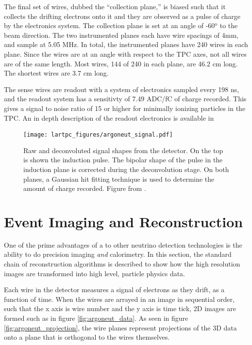 The final set of wires, dubbed the ``collection plane,'' is biased such that it collects the drifting electrons onto it and they are observed as a pulse of charge by the electronics system.  The collection plane is set at an angle of -60$^\text{o}$ to the beam direction.  The two instrumented planes each have wire spacings of 4mm, and sample at 5.05 MHz.  In total, the instrumented planes have 240 wires in each plane.  Since the wires are at an angle with respect to the TPC axes, not all wires are of the same length.  Most wires, 144 of 240 in each plane, are 46.2 cm long.  The shortest wires are 3.7 cm long.

The sense wires are readout with a system of electronics sampled every 198 ns, and the readout system has a sensitivty of 7.49 ADC/fC of charge recorded.  This gives a signal to noise ratio of 15 or higher for minimally ionizing particles in the TPC.  An in depth description of the \argoneut readout electronics is available in \cite{Anderson:2012vc}


\begin{figure}[htbp]
  \centering
  \texttt{[image: lartpc\_figures/argoneut\_signal.pdf]}
  \caption[Deconvolution of \argoneut Signals]{Raw and deconvoluted signal shapes from the \argoneut detector.  On the top is shown the induction pulse.  The bipolar shape of the pulse in the induction plane is corrected during the deconvolution stage.  On both planes, a Gaussian hit fitting technique is used to determine the amount of charge recorded. Figure from \cite{Anderson:2012vc}.}
  \label{fig:argoneut_signals}
\end{figure}

\section{\label{sec:lartpc_reconstruction} Event Imaging and Reconstruction}

One of the prime advantages of a \lartpc to other neutrino detection technologies is the ability to do precision imaging {\em and} calorimetry.  In this section, the standard chain of reconstruction algorithms is described to show how the high resolution images are transformed into high level, particle physics data.

Each wire in the detector measures a signal of electrons as they drift, as a function of time.  When the wires are arrayed in an image in sequential order, such that the x axis is wire number and the y axis is time tick, 2D images are formed such as in figure \ref{fig:argoneut_data}.  As seen in figure \ref{fig:argoneut_projection}, the wire planes represent projections of the 3D data onto a plane that is orthogonal to the wires themselves.


